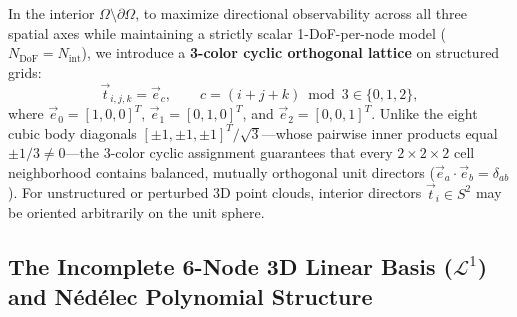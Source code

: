 \documentclass[preprint,12pt]{elsarticle}
\begin{document}
In the interior $\Omega \setminus \partial\Omega$, to maximize directional observability across all three spatial axes while maintaining a strictly scalar 1-DoF-per-node model ($N_{\text{DoF}} = N_{\text{int}}$), we introduce a \textbf{3-color cyclic orthogonal lattice} on structured grids:
\begin{equation}
    \vec{t}_{i,j,k} = \vec{e}_c, \qquad c = (i + j + k) \bmod 3 \in \{0, 1, 2\},
    \label{eq:three_color_lattice}
\end{equation}
where $\vec{e}_0 = [1, 0, 0]^T$, $\vec{e}_1 = [0, 1, 0]^T$, and $\vec{e}_2 = [0, 0, 1]^T$. Unlike the eight cubic body diagonals $[\pm 1, \pm 1, \pm 1]^T/\sqrt{3}$---whose pairwise inner products equal $\pm 1/3 \neq 0$---the 3-color cyclic assignment guarantees that every $2\times 2\times 2$ cell neighborhood contains balanced, mutually orthogonal unit directors ($\vec{e}_a \cdot \vec{e}_b = \delta_{ab}$). For unstructured or perturbed 3D point clouds, interior directors $\vec{t}_i \in S^2$ may be oriented arbitrarily on the unit sphere.

\subsection{The Incomplete 6-Node 3D Linear Basis ($\mathcal{L}^1$) and N\'{e}d\'{e}lec Polynomial Structure}
\label{subsec:incomplete_l1_3d}
\end{document}
